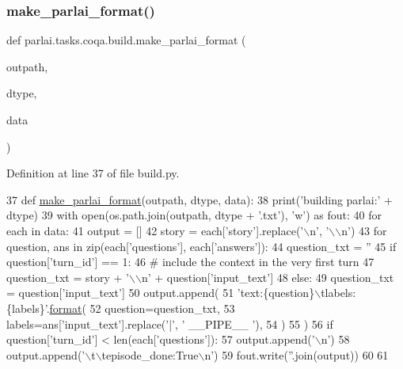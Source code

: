 \subsubsection{\texorpdfstring{make\+\_\+parlai\+\_\+format()}{make\_parlai\_format()}}
{\footnotesize\ttfamily def parlai.\+tasks.\+coqa.\+build.\+make\+\_\+parlai\+\_\+format (\begin{DoxyParamCaption}\item[{}]{outpath,  }\item[{}]{dtype,  }\item[{}]{data }\end{DoxyParamCaption})}



Definition at line 37 of file build.\+py.


\begin{DoxyCode}
37 \textcolor{keyword}{def }\hyperlink{namespaceparlai_1_1tasks_1_1quac_1_1build_a08c212462b5c58cde91192d35f24f0cc}{make\_parlai\_format}(outpath, dtype, data):
38     print(\textcolor{stringliteral}{'building parlai:'} + dtype)
39     with open(os.path.join(outpath, dtype + \textcolor{stringliteral}{'.txt'}), \textcolor{stringliteral}{'w'}) \textcolor{keyword}{as} fout:
40         \textcolor{keywordflow}{for} each \textcolor{keywordflow}{in} data:
41             output = []
42             story = each[\textcolor{stringliteral}{'story'}].replace(\textcolor{stringliteral}{'\(\backslash\)n'}, \textcolor{stringliteral}{'\(\backslash\)\(\backslash\)n'})
43             \textcolor{keywordflow}{for} question, ans \textcolor{keywordflow}{in} zip(each[\textcolor{stringliteral}{'questions'}], each[\textcolor{stringliteral}{'answers'}]):
44                 question\_txt = \textcolor{stringliteral}{''}
45                 \textcolor{keywordflow}{if} question[\textcolor{stringliteral}{'turn\_id'}] == 1:
46                     \textcolor{comment}{# include the context in the very first turn}
47                     question\_txt = story + \textcolor{stringliteral}{'\(\backslash\)\(\backslash\)n'} + question[\textcolor{stringliteral}{'input\_text'}]
48                 \textcolor{keywordflow}{else}:
49                     question\_txt = question[\textcolor{stringliteral}{'input\_text'}]
50                 output.append(
51                     \textcolor{stringliteral}{'text:\{question\}\(\backslash\)tlabels:\{labels\}'}.\hyperlink{namespaceparlai_1_1chat__service_1_1services_1_1messenger_1_1shared__utils_a32e2e2022b824fbaf80c747160b52a76}{format}(
52                         question=question\_txt,
53                         labels=ans[\textcolor{stringliteral}{'input\_text'}].replace(\textcolor{stringliteral}{'|'}, \textcolor{stringliteral}{' \_\_PIPE\_\_ '}),
54                     )
55                 )
56                 \textcolor{keywordflow}{if} question[\textcolor{stringliteral}{'turn\_id'}] < len(each[\textcolor{stringliteral}{'questions'}]):
57                     output.append(\textcolor{stringliteral}{'\(\backslash\)n'})
58             output.append(\textcolor{stringliteral}{'\(\backslash\)t\(\backslash\)tepisode\_done:True\(\backslash\)n'})
59             fout.write(\textcolor{stringliteral}{''}.join(output))
60 
61 
\end{DoxyCode}


